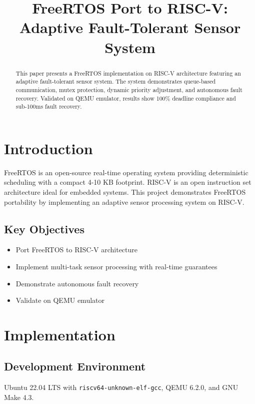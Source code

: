 \documentclass[conference]{IEEEtran}
\begin{document}
\title{FreeRTOS Port to RISC-V: Adaptive Fault-Tolerant Sensor System}

\author{
}

\maketitle

\begin{abstract}
This paper presents a FreeRTOS implementation on RISC-V architecture featuring an adaptive fault-tolerant sensor system. The system demonstrates queue-based communication, mutex protection, dynamic priority adjustment, and autonomous fault recovery. Validated on QEMU emulator, results show 100\% deadline compliance and sub-100ms fault recovery.
\end{abstract}

\section{Introduction}

FreeRTOS is an open-source real-time operating system providing deterministic scheduling with a compact 4-10 KB footprint. RISC-V is an open instruction set architecture ideal for embedded systems. This project demonstrates FreeRTOS portability by implementing an adaptive sensor processing system on RISC-V.

\subsection{Key Objectives}
\begin{itemize}
    \item Port FreeRTOS to RISC-V architecture
    \item Implement multi-task sensor processing with real-time guarantees
    \item Demonstrate autonomous fault recovery
    \item Validate on QEMU emulator
\end{itemize}

\section{Implementation}

\subsection{Development Environment}
Ubuntu 22.04 LTS with \texttt{riscv64-unknown-elf-gcc}, QEMU 6.2.0, and GNU Make 4.3.
\end{document}
